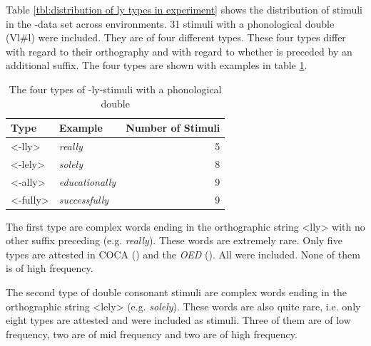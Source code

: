 Table \ref{tbl:distribution of ly types in experiment} shows the distribution of  stimuli in the -data set across environments. 
31 stimuli with a phonological double (Vl\#l) were included. 
They are of four different types. These four types differ with regard to their orthography and with regard to whether  is preceded by an additional suffix. The four types are shown with examples in table \ref{tbl:The four types of ly-stimuli with a phonological double}.




\begin{table}[b!]
	\caption{The four types of -ly-stimuli with a phonological double}
	\label{tbl:The four types of ly-stimuli with a phonological double}
	
	\begin{center}
		\begin{tabular} {llr}
			
			Type & Example & Number of  Stimuli\\
			
			\hline
			<-lly>&\color[HTML]{3166FF}\textit{really} & 5 \\ 
			<-lely>  \phantom{hggzujg}&\color[HTML]{3166FF}\textit{solely} & 8\\ 
			<-ally>&\color[HTML]{3166FF}\textit{educationally} &9\\ 
			<-fully>&\color[HTML]{3166FF}\textit{successfully} & 9 \\ 
			\hline   	
			
			
		\end{tabular}
	\end{center}
\end{table}


The first type are complex words ending in the orthographic string <lly> with no other suffix preceding  (e.g. \textit{really}). These words are extremely rare. Only five types are attested  in COCA (\citealt{Davies.20082014}) and the \textit{OED} (\citealt{OED.2013}). All were included. None of them is of high frequency.

The second type of double consonant stimuli are complex words ending in the orthographic string <lely> (e.g. \textit{solely}). These words are also quite rare, i.e. only eight  types are attested and were included as stimuli. Three of them  are of low frequency, two are of mid frequency and two are of high frequency.



